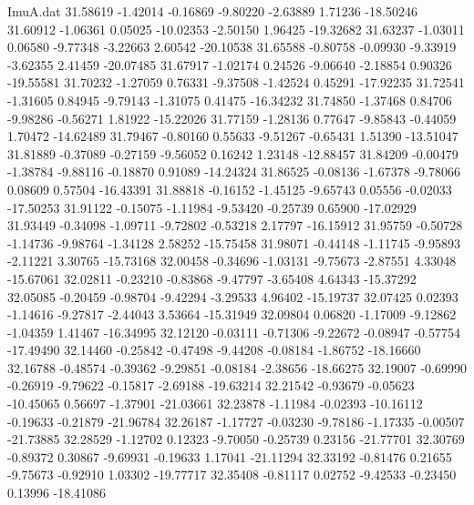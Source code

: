 \begin{filecontents}{ImuA.dat}
  31.58619   -1.42014   -0.16869   -9.80220   -2.63889    1.71236  -18.50246
  31.60912   -1.06361    0.05025  -10.02353   -2.50150    1.96425  -19.32682
  31.63237   -1.03011    0.06580   -9.77348   -3.22663    2.60542  -20.10538
  31.65588   -0.80758   -0.09930   -9.33919   -3.62355    2.41459  -20.07485
  31.67917   -1.02174    0.24526   -9.06640   -2.18854    0.90326  -19.55581
  31.70232   -1.27059    0.76331   -9.37508   -1.42524    0.45291  -17.92235
  31.72541   -1.31605    0.84945   -9.79143   -1.31075    0.41475  -16.34232
  31.74850   -1.37468    0.84706   -9.98286   -0.56271    1.81922  -15.22026
  31.77159   -1.28136    0.77647   -9.85843   -0.44059    1.70472  -14.62489
  31.79467   -0.80160    0.55633   -9.51267   -0.65431    1.51390  -13.51047
  31.81889   -0.37089   -0.27159   -9.56052    0.16242    1.23148  -12.88457
  31.84209   -0.00479   -1.38784   -9.88116   -0.18870    0.91089  -14.24324
  31.86525   -0.08136   -1.67378   -9.78066    0.08609    0.57504  -16.43391
  31.88818   -0.16152   -1.45125   -9.65743    0.05556   -0.02033  -17.50253
  31.91122   -0.15075   -1.11984   -9.53420   -0.25739    0.65900  -17.02929
  31.93449   -0.34098   -1.09711   -9.72802   -0.53218    2.17797  -16.15912
  31.95759   -0.50728   -1.14736   -9.98764   -1.34128    2.58252  -15.75458
  31.98071   -0.44148   -1.11745   -9.95893   -2.11221    3.30765  -15.73168
  32.00458   -0.34696   -1.03131   -9.75673   -2.87551    4.33048  -15.67061
  32.02811   -0.23210   -0.83868   -9.47797   -3.65408    4.64343  -15.37292
  32.05085   -0.20459   -0.98704   -9.42294   -3.29533    4.96402  -15.19737
  32.07425    0.02393   -1.14616   -9.27817   -2.44043    3.53664  -15.31949
  32.09804    0.06820   -1.17009   -9.12862   -1.04359    1.41467  -16.34995
  32.12120   -0.03111   -0.71306   -9.22672   -0.08947   -0.57754  -17.49490
  32.14460   -0.25842   -0.47498   -9.44208   -0.08184   -1.86752  -18.16660
  32.16788   -0.48574   -0.39362   -9.29851   -0.08184   -2.38656  -18.66275
  32.19007   -0.69990   -0.26919   -9.79622   -0.15817   -2.69188  -19.63214
  32.21542   -0.93679   -0.05623  -10.45065    0.56697   -1.37901  -21.03661
  32.23878   -1.11984   -0.02393  -10.16112   -0.19633   -0.21879  -21.96784
  32.26187   -1.17727   -0.03230   -9.78186   -1.17335   -0.00507  -21.73885
  32.28529   -1.12702    0.12323   -9.70050   -0.25739    0.23156  -21.77701
  32.30769   -0.89372    0.30867   -9.69931   -0.19633    1.17041  -21.11294
  32.33192   -0.81476    0.21655   -9.75673   -0.92910    1.03302  -19.77717
  32.35408   -0.81117    0.02752   -9.42533   -0.23450    0.13996  -18.41086

\end{filecontents}

